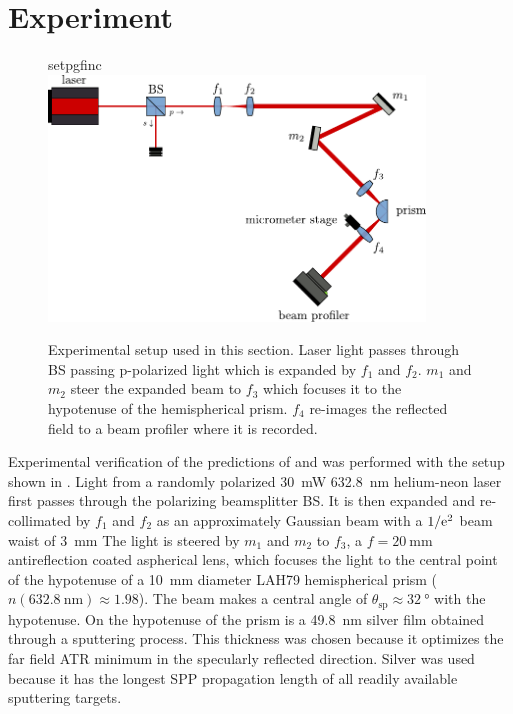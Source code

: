 \section{Experiment}
\begin{figure}[ht]
 \centering
 {setpgfinc}
 \includegraphics[keepaspectratio,width=10cm]{interference/figures/opticalsetup.pdf}
 \caption{Experimental setup used in this section.  Laser light passes
 through BS passing p-polarized light which is expanded by $f_1$ and $f_2$.
 $m_1$ and $m_2$ steer the expanded beam to $f_3$ which focuses it to the
 hypotenuse of the hemispherical prism.  $f_4$ re-images the reflected
 field to a beam profiler where it is recorded.}
 \label{fig:opticalsetup}
\end{figure}
Experimental verification of the predictions of 
and  was performed with the setup shown in
.  Light from a
randomly polarized \SI{30}{\milli\watt} \SI{632.8}{\nano\meter} helium-neon
laser first passes through the polarizing
beamsplitter BS.  It is then expanded and re-collimated by $f_1$ and $f_2$ as an
approximately Gaussian beam with a $1/{\mathrm{e}}^2$ beam waist of
\SI{3}{\milli\meter} The light is steered by $m_1$ and $m_2$ to $f_3$, a
$f=\SI{20}{\milli\meter}$ antireflection coated aspherical lens, which
focuses the light to the central point of the hypotenuse of a
\SI{10}{\milli\meter} diameter LAH79 hemispherical prism
($n(\SI{632.8}{\nano\meter})\approx1.98$).  The beam makes a central angle
of $\theta_\text{sp}\approx\SI{32}{\degree}$ with the hypotenuse.
On the hypotenuse of the prism is a \SI{49.8}{\nano\meter} silver film
obtained through a sputtering process.  This thickness was chosen because
it optimizes the far field ATR minimum in the specularly reflected
direction.  Silver was used because it has the longest SPP propagation
length of all readily available sputtering targets.
